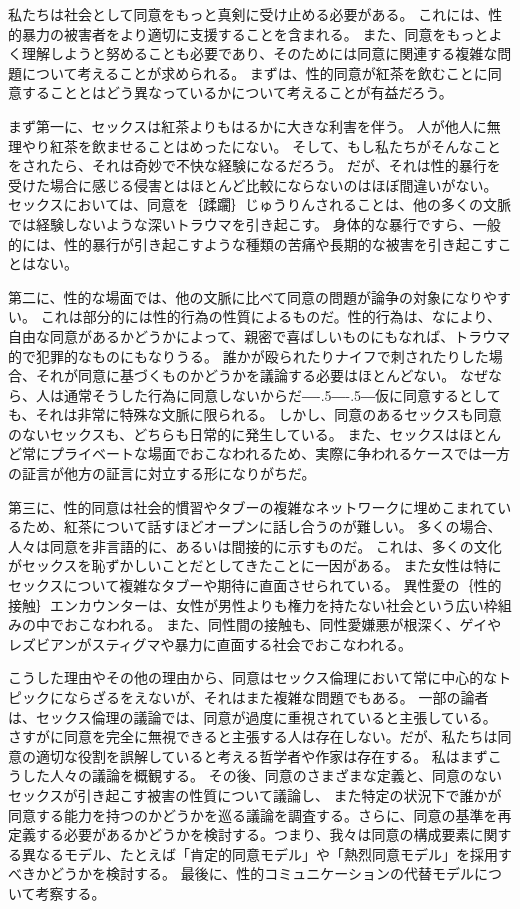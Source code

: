 \documentclass[paper=a4,book,openany]{jlreq}
\def\DDASH{―\kern-.5\zw―\kern-.5\zw―} %
\begin{document}
私たちは社会として同意をもっと真剣に受け止める必要がある。
これには、性的暴力の被害者をより適切に支援することを含まれる。
また、同意をもっとよく理解しようと努めることも必要であり、そのためには同意に関連する複雑な問題について考えることが求められる。
まずは、性的同意が紅茶を飲むことに同意することとはどう異なっているかについて考えることが有益だろう。

まず第一に、セックスは紅茶よりもはるかに大きな利害を伴う。
人が他人に無理やり紅茶を飲ませることはめったにない。
そして、もし私たちがそんなことをされたら、それは奇妙で不快な経験になるだろう。
だが、それは性的暴行を受けた場合に感じる侵害とはほとんど比較にならないのはほぼ間違いがない。
セックスにおいては、同意を｛蹂躙｝{じゅうりん}されることは、他の多くの文脈では経験しないような深いトラウマを引き起こす。
身体的な暴行ですら、一般的には、性的暴行が引き起こすような種類の苦痛や長期的な被害を引き起こすことはない。

第二に、性的な場面では、他の文脈に比べて同意の問題が論争の対象になりやすい。
これは部分的には性的行為の性質によるものだ。性的行為は、なにより、自由な同意があるかどうかによって、親密で喜ばしいものにもなれば、トラウマ的で犯罪的なものにもなりうる。
誰かが殴られたりナイフで刺されたりした場合、それが同意に基づくものかどうかを議論する必要はほとんどない。
なぜなら、人は通常そうした行為に同意しないからだ{\DDASH}仮に同意するとしても、それは非常に特殊な文脈に限られる。
しかし、同意のあるセックスも同意のないセックスも、どちらも日常的に発生している。
また、セックスはほとんど常にプライベートな場面でおこなわれるため、実際に争われるケースでは一方の証言が他方の証言に対立する形になりがちだ。

第三に、性的同意は社会的慣習やタブーの複雑なネットワークに埋めこまれているため、紅茶について話すほどオープンに話し合うのが難しい。
多くの場合、人々は同意を非言語的に、あるいは間接的に示すものだ。
これは、多くの文化がセックスを恥ずかしいことだとしてきたことに一因がある。
また女性は特にセックスについて複雑なタブーや期待に直面させられている。
異性愛の｛性的接触｝{エンカウンター}は、女性が男性よりも権力を持たない社会という広い枠組みの中でおこなわれる。
また、同性間の接触も、同性愛嫌悪が根深く、ゲイやレズビアンがスティグマや暴力に直面する社会でおこなわれる。

こうした理由やその他の理由から、同意はセックス倫理において常に中心的なトピックにならざるをえないが、それはまた複雑な問題でもある。
一部の論者は、セックス倫理の議論では、同意が過度に重視されていると主張している。
さすがに同意を完全に無視できると主張する人は存在しない。だが、私たちは同意の適切な役割を誤解していると考える哲学者や作家は存在する。
私はまずこうした人々の議論を概観する。
その後、同意のさまざまな定義と、同意のないセックスが引き起こす被害の性質について議論し、
また特定の状況下で誰かが同意する能力を持つのかどうかを巡る議論を調査する。さらに、同意の基準を再定義する必要があるかどうかを検討する。つまり、我々は同意の構成要素に関する異なるモデル、たとえば「肯定的同意モデル」や「熱烈同意モデル」を採用すべきかどうかを検討する。
最後に、性的コミュニケーションの代替モデルについて考察する。
\end{document}
